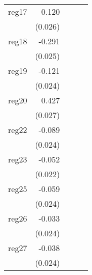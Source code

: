 {\begin{longtable}{l*{4}{D{.}{.}{-1}}}
\addlinespace
reg17       &       0.120\sym{***}&                     &                     &                     \\
            &     (0.026)         &                     &                     &                     \\
\addlinespace
reg18       &      -0.291\sym{***}&                     &                     &                     \\
            &     (0.025)         &                     &                     &                     \\
\addlinespace
reg19       &      -0.121\sym{***}&                     &                     &                     \\
            &     (0.024)         &                     &                     &                     \\
\addlinespace
reg20       &       0.427\sym{***}&                     &                     &                     \\
            &     (0.027)         &                     &                     &                     \\
\addlinespace
reg22       &      -0.089\sym{***}&                     &                     &                     \\
            &     (0.024)         &                     &                     &                     \\
\addlinespace
reg23       &      -0.052\sym{*}  &                     &                     &                     \\
            &     (0.022)         &                     &                     &                     \\
\addlinespace
reg25       &      -0.059\sym{*}  &                     &                     &                     \\
            &     (0.024)         &                     &                     &                     \\
\addlinespace
reg26       &      -0.033         &                     &                     &                     \\
            &     (0.024)         &                     &                     &                     \\
\addlinespace
reg27       &      -0.038         &                     &                     &                     \\
            &     (0.024)         &                     &                     &                     \\

\end{longtable}}
